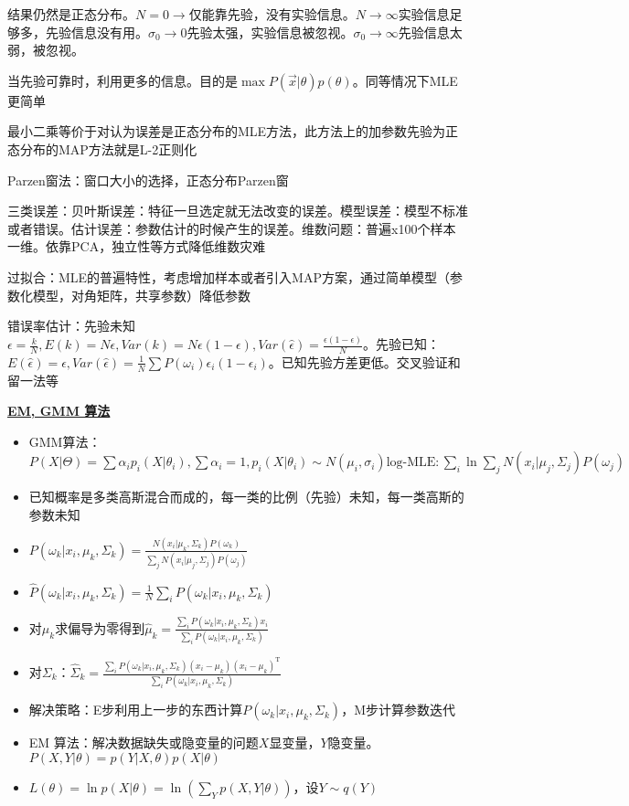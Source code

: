\documentclass[UTF8,a4paper,landscape,compress]{paper}
\renewcommand{\subsection}[1]{{\small\textbf{\underline{#1}}}\\ }
\newcommand{\List}[1]{\begin{itemize}[fullwidth,itemindent=0em] #1 \end{itemize}}
\begin{document}
\begin{multicols}{4}
{{    结果仍然是正态分布。$N=0\rightarrow$仅能靠先验，没有实验信息。$N\rightarrow \infty$实验信息足够多，先验信息没有用。$\sigma_0\rightarrow 0$先验太强，实验信息被忽视。$\sigma_0\rightarrow\infty$先验信息太弱，被忽视。
    
    当先验可靠时，利用更多的信息。目的是$\max P(\vec x | \theta)p(\theta)$。同等情况下MLE更简单}

    \item {最小二乘等价于对认为误差是正态分布的MLE方法，此方法上的加参数先验为正态分布的MAP方法就是L-2正则化}
    \item {Parzen窗法：窗口大小的选择，正态分布Parzen窗}
    \item {三类误差：贝叶斯误差：特征一旦选定就无法改变的误差。模型误差：模型不标准或者错误。估计误差：参数估计的时候产生的误差。维数问题：普遍x100个样本一维。依靠PCA，独立性等方式降低维数灾难}
    \item {过拟合：MLE的普遍特性，考虑增加样本或者引入MAP方案，通过简单模型（参数化模型，对角矩阵，共享参数）降低参数}
    \item {错误率估计：先验未知$\epsilon = \frac kN, E(k) = N\epsilon, Var(k) = N\epsilon(1-\epsilon),Var(\hat\epsilon) = \frac{\epsilon(1-\epsilon)}{N}$。先验已知：$E(\hat\epsilon) = \epsilon, Var(\hat\epsilon) = \frac1N\sum P(\omega_i)\epsilon_i(1-\epsilon_i)$。已知先验方差更低。交叉验证和留一法等}
}
\subsection{EM, GMM 算法}
\List{
    \item {GMM算法：$P(X|\Theta) = \sum\alpha_ip_i(X|\theta_i),\sum \alpha_i = 1, p_i(X|\theta_i)\sim N(\mu_i,\sigma_i) \text{log-MLE}: \sum_i\ln\sum_jN(x_i|\mu_j,\Sigma_j)P(\omega_j)$}
    \item {已知概率是多类高斯混合而成的，每一类的比例（先验）未知，每一类高斯的参数未知}
    \item {$P(\omega_k|x_i,\mu_k,\Sigma_k) = \frac{N(x_i|\mu_k,\Sigma_k)P(\omega_k)}{\sum_j N(x_i|\mu_j,\Sigma_j)P(\omega_j)}$}
    \item {$\hat P(\omega_k|x_i,\mu_k,\Sigma_k) = \frac1N\sum_i P(\omega_k|x_i,\mu_k,\Sigma_k)$}
    \item {对$\mu_k$求偏导为零得到$\hat\mu_k = \frac{\sum_i P(\omega_k|x_i,\mu_k,\Sigma_k)x_i}{\sum_i P(\omega_k|x_i,\mu_k,\Sigma_k)}$}
    \item {对$\Sigma_k$：$\hat\Sigma_k = \frac{\sum_i P(\omega_k|x_i,\mu_k,\Sigma_k)(x_i-\mu_k)(x_i-\mu_k)^{\mathrm T}}{\sum_i P(\omega_k|x_i,\mu_k,\Sigma_k)}$}
    \item {解决策略：E步利用上一步的东西计算$P(\omega_k|x_i,\mu_k,\Sigma_k)$，M步计算参数迭代}
    \item {EM 算法：解决数据缺失或隐变量的问题$X$显变量，$Y$隐变量。$P(X,Y|\theta) = p(Y|X,\theta)p(X|\theta)$}
    \item {$L(\theta) = \ln p(X|\theta) = \ln (\sum_Yp(X,Y|\theta))$，设$Y\sim q(Y)$}
}

\end{multicols}
\end{document}
